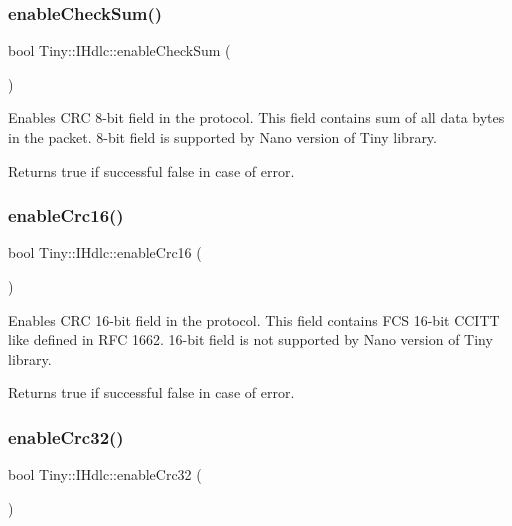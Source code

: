 \subsubsection{\texorpdfstring{enable\+Check\+Sum()}{enableCheckSum()}}
{\footnotesize\ttfamily bool Tiny\+::\+I\+Hdlc\+::enable\+Check\+Sum (\begin{DoxyParamCaption}{ }\end{DoxyParamCaption})}

Enables C\+RC 8-\/bit field in the protocol. This field contains sum of all data bytes in the packet. 8-\/bit field is supported by Nano version of Tiny library. \begin{DoxyReturn}{Returns}
true if successful false in case of error. 
\end{DoxyReturn}
\mbox{\label{classTiny_1_1IHdlc_acedafa846397ca07002d2c6374d6d85e}} 
\subsubsection{\texorpdfstring{enable\+Crc16()}{enableCrc16()}}
{\footnotesize\ttfamily bool Tiny\+::\+I\+Hdlc\+::enable\+Crc16 (\begin{DoxyParamCaption}{ }\end{DoxyParamCaption})}

Enables C\+RC 16-\/bit field in the protocol. This field contains F\+CS 16-\/bit C\+C\+I\+TT like defined in R\+FC 1662. 16-\/bit field is not supported by Nano version of Tiny library. \begin{DoxyReturn}{Returns}
true if successful false in case of error. 
\end{DoxyReturn}
\mbox{\label{classTiny_1_1IHdlc_a857e7423c3ac10f15fac95e23e2a3eee}} 
\subsubsection{\texorpdfstring{enable\+Crc32()}{enableCrc32()}}
{\footnotesize\ttfamily bool Tiny\+::\+I\+Hdlc\+::enable\+Crc32 (\begin{DoxyParamCaption}{ }\end{DoxyParamCaption})}

